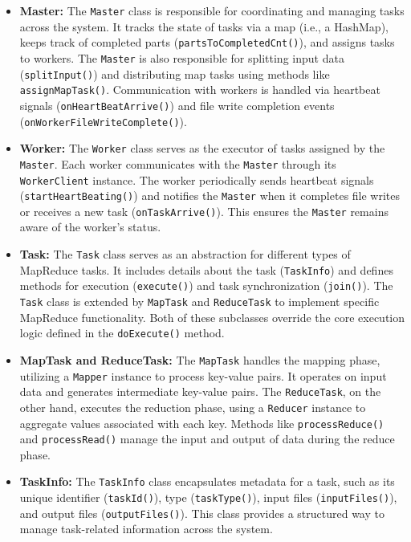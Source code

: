 \begin{itemize}
    \item \textbf{Master:} The \texttt{Master} class is responsible for coordinating and managing tasks across the system. It tracks the state of tasks via a map (i.e., a HashMap), keeps track of completed parts (\texttt{partsToCompletedCnt()}), and assigns tasks to workers. The \texttt{Master} is also responsible for splitting input data (\texttt{splitInput()}) and distributing map tasks using methods like \texttt{assignMapTask()}. Communication with workers is handled via heartbeat signals (\texttt{onHeartBeatArrive()}) and file write completion events (\texttt{onWorkerFileWriteComplete()}).
    \item \textbf{Worker:} The \texttt{Worker} class serves as the executor of tasks assigned by the \texttt{Master}. Each worker communicates with the \texttt{Master} through its \texttt{WorkerClient} instance. The worker periodically sends heartbeat signals (\texttt{startHeartBeating()}) and notifies the \texttt{Master} when it completes file writes or receives a new task (\texttt{onTaskArrive()}). This ensures the \texttt{Master} remains aware of the worker’s status.
    \item \textbf{Task:} The \texttt{Task} class serves as an abstraction for different types of MapReduce tasks. It includes details about the task (\texttt{TaskInfo}) and defines methods for execution (\texttt{execute()}) and task synchronization (\texttt{join()}). The \texttt{Task} class is extended by \texttt{MapTask} and \texttt{ReduceTask} to implement specific MapReduce functionality. Both of these subclasses override the core execution logic defined in the \texttt{doExecute()} method.
    \item \textbf{MapTask and ReduceTask:} The \texttt{MapTask} handles the mapping phase, utilizing a \texttt{Mapper} instance to process key-value pairs. It operates on input data and generates intermediate key-value pairs. The \texttt{ReduceTask}, on the other hand, executes the reduction phase, using a \texttt{Reducer} instance to aggregate values associated with each key. Methods like \texttt{processReduce()} and \texttt{processRead()} manage the input and output of data during the reduce phase.
    \item \textbf{TaskInfo:} The \texttt{TaskInfo} class encapsulates metadata for a task, such as its unique identifier (\texttt{taskId()}), type (\texttt{taskType()}), input files (\texttt{inputFiles()}), and output files (\texttt{outputFiles()}). This class provides a structured way to manage task-related information across the system.

\end{itemize}
